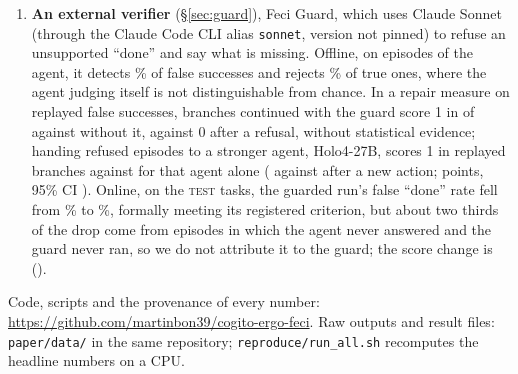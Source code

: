 \begin{enumerate}
\item \textbf{An external verifier} (\S\ref{sec:guard}), Feci Guard, which uses Claude Sonnet (through the Claude Code CLI alias \texttt{sonnet}, version not pinned) to refuse an unsupported ``done'' and say what is missing. Offline, on \gbEpisodes{} episodes of the agent, it detects \gbClaudeDet\% of false successes and rejects \gbClaudeRej\% of true ones, where the agent judging itself is not distinguishable from chance. In a repair measure on replayed false successes, branches continued with the guard score 1 in \fgRepRepairedGuard{} of \fgRepBranches{} against \fgRepRepairedNog{} without it, \fgRepSpecific{} against 0 after a refusal, without statistical evidence; handing refused episodes to a stronger agent, Holo4-27B, scores 1 in \rbGuardSucc{} replayed branches against \rbCtrlSucc{} for that agent alone (\rbGuardAfterAction{} against \rbCtrlAfterAction{} after a new action; \rbPrimDiff{} points, 95\% CI \rbPrimDiffCi). Online, on the \OgN{} \textsc{test} tasks, the guarded run's false ``done'' rate fell from \OgFdBase\% to \OgFdGuard\%, formally meeting its registered criterion, but about two thirds of the drop come from episodes in which the agent never answered and the guard never ran, so we do not attribute it to the guard; the score change is \OgScoreDiff{} (\OgScoreDiffCi).
\end{enumerate}
Code, scripts and the provenance of every number: \url{https://github.com/martinbon39/cogito-ergo-feci}. Raw outputs and result files: \texttt{paper/data/} in the same repository; \texttt{reproduce/run\_all.sh} recomputes the headline numbers on a CPU.

